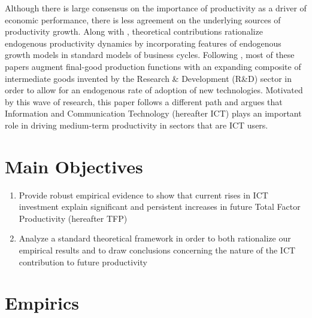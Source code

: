 \documentclass[a0,landscape]{a0poster}
\begin{document}
\begin{multicols}{4}
Although there is large consensus on the importance of productivity as a driver of economic performance, there is less agreement on the underlying sources of productivity growth. Along with \cite{comin2006medium}, theoretical contributions rationalize endogenous productivity dynamics by incorporating features of endogenous growth models in standard models of business cycles. Following \cite{romer1990endogenous}, most of these papers augment final-good production functions with an expanding composite of intermediate goods invented by the Research \& Development (R\&D) sector in order to allow for an endogenous rate of adoption of new technologies. Motivated by this wave of research, this paper follows a different path and argues that Information and Communication Technology (hereafter ICT) plays an important role in driving medium-term productivity in sectors that are ICT users.



\section*{Main Objectives}

\begin{enumerate}
\item Provide robust empirical evidence to show that current rises in ICT investment explain significant and persistent increases in future Total Factor Productivity (hereafter TFP)
\item Analyze a standard theoretical framework in order to both rationalize our empirical results and to draw conclusions concerning the nature of the ICT contribution to future productivity
\end{enumerate}


\section*{Empirics}


\end{multicols}
\end{document}

